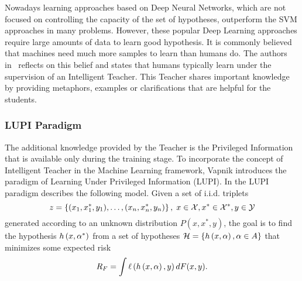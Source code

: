 Nowadays learning approaches based on Deep Neural Networks, which are not focused on controlling the capacity of the set of hypotheses, outperform the SVM approaches in many problems. However, these popular Deep Learning approaches require large amounts of data to learn good hypothesis.
It is commonly believed that machines need much more samples to learn than humans do. The authors in~\cite{VapnikV09, VapnikI15a} reflects on this belief and states that humans typically learn under the supervision of an Intelligent Teacher.
This Teacher shares important knowledge by providing metaphors, examples or clarifications that are helpful for the students.



\subsubsection*{LUPI Paradigm}
The additional knowledge provided by the Teacher is the Privileged Information that is available only during the training stage.
To incorporate the concept of Intelligent Teacher in the Machine Learning framework, Vapnik introduces the paradigm of Learning Under Privileged Information (LUPI).
In the LUPI paradigm describes the following model. Given a set of i.i.d. triplets
$$ z = \left\{(x_1, x^*_1, y_1), \ldots, (x_n,x^*_n, y_n)\right\}, \; x \in \mathcal{X}, x^* \in \mathcal{X}^*, y \in \mathcal{Y} $$
generated according to an unknown distribution $P(x, x^*, y)$, the goal is to find the hypothesis $h\left(x, \alpha^*\right)$ from a set of hypotheses $\mathcal{H} = \left\{h\left(x, \alpha\right), \alpha \in A\right\}$ that minimizes some expected risk 
$$ R_F = \int \ell\left( h\left(x, \alpha\right), y\right) dF(x, y). $$

